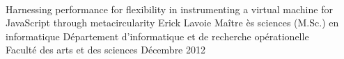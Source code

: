 \documentclass[letterpaper,9pt]{report}
\begin{document}


% 


\newpage
\addtocounter{page}{-1}
\thispagestyle{empty}
\vspace{1cm}
\ \\
\newpage
\titrememoire
    {Harnessing performance for flexibility in instrumenting a virtual machine
    for JavaScript through metacircularity}
	{Erick Lavoie}
	{Ma\^itre \`es sciences (M.Sc.) en informatique}
	{D\'epartement d'informatique et de recherche op\'erationelle\\
    Facult\'e des arts et des sciences}
	{D\'ecembre}
    {2012}



%

%

%
%








%





% 
\newpage
\addtocounter{page}{-1}
\thispagestyle{empty}
\vspace{1cm}
\ \\
\end{document}
